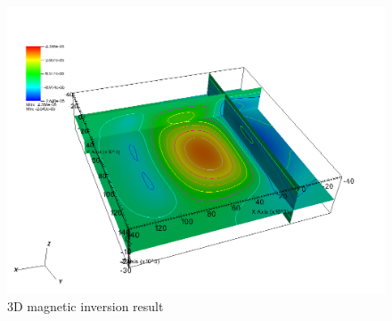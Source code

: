 \begin{figure}
\centering
\includegraphics[width=\textwidth]{mag3D1.png}
\caption{3D magnetic inversion result}

\end{figure}
